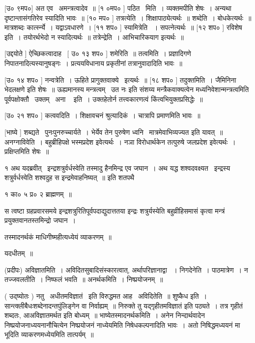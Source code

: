 \documentclass[11pt, openany]{book}
\begin{document}
 [उ० ९मप०] अत एव \textendash\ अमन्त्रत्वादेव~॥ [१ ०मप० ] पठित \textendash\ मिति~। 
व्यक्तमपीति शेषः~। अन्यथा दृष्टान्तासंगतिरेव स्यादिति भावः~॥ [१० मप०
] तत्रत्येति~। शिक्षापाठ्येत्यर्थः~॥ शब्देति~। बोधकेत्यर्थः~॥
मात्रशब्दः कार्त्स्न्ये~। यद्वाऽवधारणे~। [११ शप० ] स्यामित्रेति
~। सपत्नेत्यर्थः~॥ [१२ शप० ] रविशेष इति~। तयोरर्थभेदो न
स्यादित्यर्थः~॥ तत्रेन्द्रेति~। आभिचारिकयाग इत्यर्थः~॥ 

 [उद्दयोते ] ऐच्छिकत्वादाह \textendash\ [ उ० १३ शप० ] शमेरिति~॥ तत्वमिति~। 
प्रज्ञादिगणे निपातनादित्यस्यानुषङ्गः~। प्रत्ययविधानाय प्रकृतीनां
तत्रानुवादादिति भावः~॥ 

 [उ० १४ शप० ] नन्वत्रेति~। ऊहिते प्रागुक्तवाक्ये \textendash\ इत्यर्थः~॥
[१८ शप० ] तदुक्तमिति~। जैमिनिना भेदलक्षणे इति शेषः~॥
{\qt ऊह्यमानस्य मन्त्रत्वम् \textendash\ उत नः} इति संशय्य मन्त्रैकवाक्यत्वेन
मध्यनिवेशान्मन्त्रत्वमिति पूर्वपक्षोक्तौ \textendash\ उक्तम् \textendash\ {\qt अना \textendash\ } इति~। उक्तहेतोर्न
तत्त्वकारणत्वं किंत्वभियुक्तप्रसिद्धेः~॥ 

 [उ० २१ शप० ] कत्ववदिति~। शिक्षावचनं श्रुत्यादिकं~। चात्रापि
प्रमाणमिति भावः~॥ 

 [भाष्ये ] शब्द्यते \textendash\ पुनःपुनरुच्चार्यते~। भेर्येव तेन पुरुषेण ध्वनि \textendash\ 
मात्रमेवाभिव्यज्यत इति यावत्~॥ अनग्नाविवेति~। बहुब्रीहिपक्षे भस्मप्रदेश
इवेत्यर्थः~। नञा विरोधार्थकेन तत्पुरुषे जलप्रदेश इवेत्यर्थः~। 
प्रक्षिप्तमिति शेषः~॥



१ {\qt अथ यदब्रवीत् \textendash\ इन्द्रशत्रुर्वर्धस्वेति तस्मादु हैनमिन्द्र एव जघान~। 
अथ यद्ध शश्वदवक्ष्यत \textendash\ इन्द्रस्य शत्रुर्वर्धस्वेति शश्वदुह स
इन्द्रमेवाहनिष्यत्~॥} इति शतपथै 

१ का० ५ प्र० २ ब्राह्मणम्~॥ 

स त्वष्टा ग्रहप्रवारसमये इन्द्रशत्रुरितिपूर्वपदाद्युदात्ततया इन्द्रः
शत्रुर्यस्येति बहुव्रीहिसमासं कृत्वा मन्त्रं प्रयुक्तवानतस्तमिन्द्रो
जघान~। 





तस्मादनर्थकं माधिगीष्महीत्यध्येयं व्याकरणम्~॥

 यदधीतम्~॥ 

 (प्रदीपः) अविज्ञातमिति~। अविदितसुबादिसंस्कारत्वात्, अर्थापरिज्ञानाद्वा
~। निगदेनेति~। पाठमात्रेण~। न तज्जवलतीति~। निष्फलं भवति~॥
अनर्थकमिति~। निष्प्रयोजनम्~॥ 

 ( उद्ष्योतः ) नतु \textendash\ अधीतमविज्ञातं \textendash\ इति विरुद्धमत आह \textendash\ अविदितेति~॥ शुष्कैध
इति~। सान्त्क्लीबैधःशब्देनादन्तपुंलिङ्गेन वा निर्वाह्यम्~॥ निरुक्ते तु
यद्गृहीतमविज्ञातं इति पठ्यते~। तत्र गृहीतं शब्दतः, आअविज्ञातमर्थत इति
बोध्यम्~॥ भाष्येतस्मादनर्थकमिति~। अनेन निन्दार्थवादेन
निष्प्रयोजनाध्ययनानौचित्येन निष्प्रयोजनं नाध्येयमिति निषेधकल्पनादिति
भावः~। अतो निषिद्धमध्ययनं मा भूदिति व्याकरणमध्येयमिति तात्पर्यम्~॥ 
\end{document}
